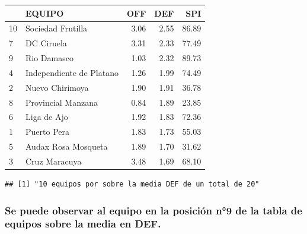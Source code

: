 \documentclass[]{article}
\newenvironment{Shaded}{\begin{snugshade}}{\end{snugshade}}
\newcommand{\KeywordTok}[1]{\textcolor[rgb]{0.13,0.29,0.53}{\textbf{#1}}}
\newcommand{\NormalTok}[1]{#1}
\newcommand{\OperatorTok}[1]{\textcolor[rgb]{0.81,0.36,0.00}{\textbf{#1}}}
\newcommand{\StringTok}[1]{\textcolor[rgb]{0.31,0.60,0.02}{#1}}
\begin{document}
\begin{table}[H]
\centering
\begin{tabular}{l|l|r|r|r}
\hline
  & EQUIPO & OFF & DEF & SPI\\
\hline
\rowcolor{gray!6}  10 & Sociedad Frutilla & 3.06 & 2.55 & 86.89\\
\hline
7 & DC Ciruela & 3.31 & 2.33 & 77.49\\
\hline
\rowcolor{gray!6}  9 & Rio Damasco & 1.03 & 2.32 & 89.73\\
\hline
4 & Independiente de  Platano & 1.26 & 1.99 & 74.49\\
\hline
\rowcolor{gray!6}  2 & Nuevo Chirimoya & 1.90 & 1.91 & 36.78\\
\hline
8 & Provincial Manzana & 0.84 & 1.89 & 23.85\\
\hline
\rowcolor{gray!6}  6 & Liga de Ajo & 1.92 & 1.83 & 72.36\\
\hline
1 & Puerto Pera & 1.83 & 1.73 & 55.03\\
\hline
\rowcolor{gray!6}  5 & Audax Rosa Mosqueta & 1.89 & 1.70 & 31.62\\
\hline
3 & Cruz Maracuya & 3.48 & 1.69 & 68.10\\
\hline
\end{tabular}
\end{table}

\begin{Shaded}
\end{Shaded}

\begin{verbatim}
## [1] "10 equipos por sobre la media DEF de un total de 20"
\end{verbatim}

\hypertarget{se-puede-observar-al-equipo-en-la-posicion-n9-de-la-tabla-de-equipos-sobre-la-media-en-def.}{%
\subsubsection{Se puede observar al equipo en la posición n°9 de la
tabla de equipos sobre la media en
DEF.}\label{se-puede-observar-al-equipo-en-la-posicion-n9-de-la-tabla-de-equipos-sobre-la-media-en-def.}}
\end{document}
